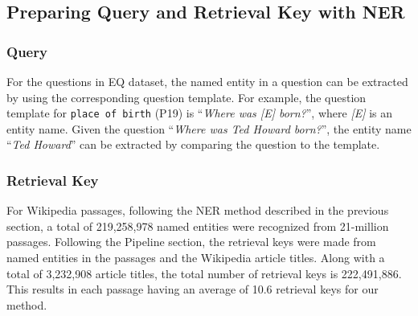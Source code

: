 \documentclass[letterpaper]{article} %
\begin{document}


\subsection{Preparing Query and Retrieval Key with NER}\label{sec:q_k_gen}
\subsubsection{Query}
For the questions in EQ dataset, the named entity in a question can be extracted by using the corresponding question template.
For example, the question template for \texttt{\small place of birth} (P19) is ``\textit{Where was [E] born?}'', where \textit{[E]} is an entity name.
Given the question ``\textit{Where was Ted Howard born?}'', the entity name ``\textit{Ted Howard}'' can be extracted by comparing the question to the template.

\subsubsection{Retrieval Key}
For Wikipedia passages, following the NER method described in the previous section, a total of 219,258,978 named entities were recognized from 21-million passages.
Following the Pipeline section, the retrieval keys were made from named entities in the passages and the Wikipedia article titles.
Along with a total of 3,232,908 article titles, the total number of retrieval keys is 222,491,886.
This results in each passage having an average of 10.6 retrieval keys for our method.
\end{document}

